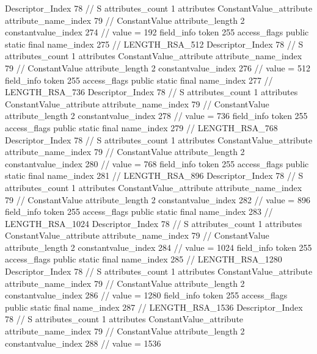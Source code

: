 {{{{{				Descriptor_Index	78		// S
				attributes_count	1
				attributes {
				ConstantValue_attribute {
					attribute_name_index	79		// ConstantValue
					attribute_length	2
					constantvalue_index	274		// value = 192
				}
				}
			}
			field_info {
				token	255
				access_flags	public static final
				name_index	275		// LENGTH_RSA_512
				Descriptor_Index	78		// S
				attributes_count	1
				attributes {
				ConstantValue_attribute {
					attribute_name_index	79		// ConstantValue
					attribute_length	2
					constantvalue_index	276		// value = 512
				}
				}
			}
			field_info {
				token	255
				access_flags	public static final
				name_index	277		// LENGTH_RSA_736
				Descriptor_Index	78		// S
				attributes_count	1
				attributes {
				ConstantValue_attribute {
					attribute_name_index	79		// ConstantValue
					attribute_length	2
					constantvalue_index	278		// value = 736
				}
				}
			}
			field_info {
				token	255
				access_flags	public static final
				name_index	279		// LENGTH_RSA_768
				Descriptor_Index	78		// S
				attributes_count	1
				attributes {
				ConstantValue_attribute {
					attribute_name_index	79		// ConstantValue
					attribute_length	2
					constantvalue_index	280		// value = 768
				}
				}
			}
			field_info {
				token	255
				access_flags	public static final
				name_index	281		// LENGTH_RSA_896
				Descriptor_Index	78		// S
				attributes_count	1
				attributes {
				ConstantValue_attribute {
					attribute_name_index	79		// ConstantValue
					attribute_length	2
					constantvalue_index	282		// value = 896
				}
				}
			}
			field_info {
				token	255
				access_flags	public static final
				name_index	283		// LENGTH_RSA_1024
				Descriptor_Index	78		// S
				attributes_count	1
				attributes {
				ConstantValue_attribute {
					attribute_name_index	79		// ConstantValue
					attribute_length	2
					constantvalue_index	284		// value = 1024
				}
				}
			}
			field_info {
				token	255
				access_flags	public static final
				name_index	285		// LENGTH_RSA_1280
				Descriptor_Index	78		// S
				attributes_count	1
				attributes {
				ConstantValue_attribute {
					attribute_name_index	79		// ConstantValue
					attribute_length	2
					constantvalue_index	286		// value = 1280
				}
				}
			}
			field_info {
				token	255
				access_flags	public static final
				name_index	287		// LENGTH_RSA_1536
				Descriptor_Index	78		// S
				attributes_count	1
				attributes {
				ConstantValue_attribute {
					attribute_name_index	79		// ConstantValue
					attribute_length	2
					constantvalue_index	288		// value = 1536
				}
				}
}}}}}
